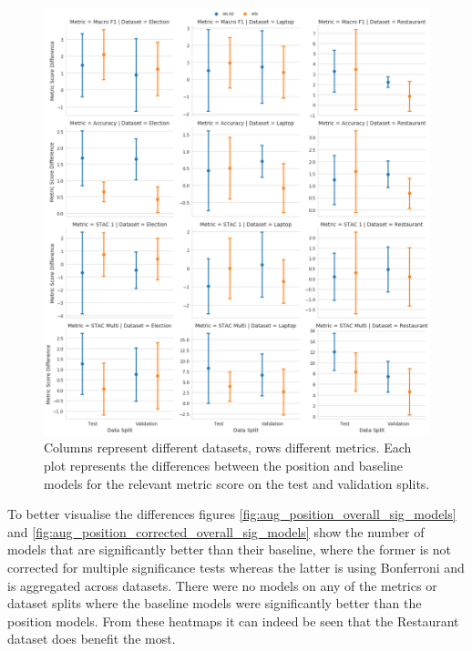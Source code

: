 
\begin{figure}[h!]
    \centering
    \includegraphics[scale=0.4]{images/augmentation/methods_performance/Position_Encoding/position_baseline_overall_differences.png}
    \caption{Columns represent different datasets, rows different metrics. Each plot represents the differences between the position and baseline models for the relevant metric score on the test and validation splits.}
    \label{fig:aug_position_baseline_overall_differences}
\end{figure}

To better visualise the differences figures \ref{fig:aug_position_overall_sig_models} and \ref{fig:aug_position_corrected_overall_sig_models} show the number of models that are significantly better than their baseline, where the former is not corrected for multiple significance tests whereas the latter is using Bonferroni and is aggregated across datasets. There were no models on any of the metrics or dataset splits where the baseline models were significantly better than the position models. From these heatmaps it can indeed be seen that the Restaurant dataset does benefit the most.%

